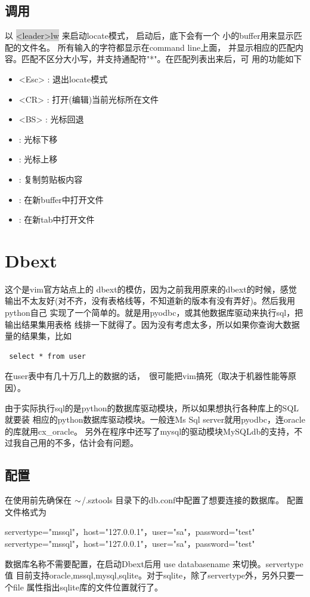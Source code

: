 \documentclass[oneside,openany]{book}
\begin{document}
\subsection{调用}
   以 \colorbox{lightgray}{<leader>lw} 来启动locate模式， 启动后，底下会有一个
小的buffer用来显示匹配的文件名。 所有输入的字符都显示在command line上面，
并显示相应的匹配内容。匹配不区分大小写，并支持通配符"*"。在匹配列表出来后，可
用的功能如下
    \begin{itemize}
        \item <Esc> : 退出locate模式
        \item <CR>  : 打开(编辑)当前光标所在文件 
        \item <BS>  : 光标回退
        \item <C-j> : 光标下移
        \item <C-k> : 光标上移
        \item <C-v> : 复制剪贴板内容
        \item <C-b> : 在新buffer中打开文件
        \item <C-t> : 在新tab中打开文件
    \end{itemize}
    

\section{Dbext}

  这个是vim官方站点上的 dbext的模仿，因为之前我用原来的dbext的时候，感觉
输出不太友好(对不齐，没有表格线等，不知道新的版本有没有弄好)。然后我用python自己
实现了一个简单的。就是用pyodbc，或其他数据库驱动来执行sql，把输出结果集用表格
线排一下就得了。因为没有考虑太多，所以如果你查询大数据量的结果集，比如 
\begin{verbatim} select * from user \end{verbatim}
在user表中有几十万几上的数据的话，　很可能把vim搞死（取决于机器性能等原因）。

由于实际执行sql的是python的数据库驱动模块，所以如果想执行各种库上的SQL就要装
相应的python数据库驱动模块。一般连Ms Sql server就用pyodbc，连oracle的库就用cx\_oracle。
另外在程序中还写了mysql的驱动模块MySQLdb的支持，不过我自己用的不多，估计会有问题。

\subsection{配置}
   在使用前先确保在 $\tiny{\sim}$/.sztools 目录下的db.conf中配置了想要连接的数据库。
   配置文件格式为
    \begin{mdframed}[style=SmallFrame]
    \begin{flushleft}
    servertype="mssql"，host="127.0.0.1"，user="sa"，password="test"\newline
    servertype="mssql"，host="127.0.0.1"，user="sa"，password="test"
    \end{flushleft}
    \end{mdframed}
    数据库名称不需要配置，在启动Dbext后用 use databasename 来切换。servertype值
目前支持oracle,mssql,mysql,sqlite。对于sqlite，除了servertype外，另外只要一个file
属性指出sqlite库的文件位置就行了。
\end{document}
